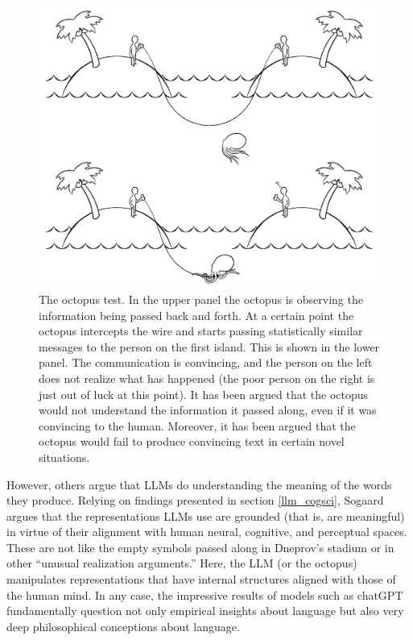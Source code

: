 \begin{figure}[h]
\centering
\includegraphics[scale=.20]{./images/octopusTest.png}
\caption[Soraya Boza.]{The octopus test. In the upper panel the octopus is observing the information being passed back and forth. At a certain point the octopus intercepts the wire and starts passing statistically similar messages to the person on the first island. This is shown in the lower panel. The communication is convincing, and the person on the left does not realize what has happened (the poor person on the right is just out of luck at this point). It has been argued that the octopus would not understand the information it passed along, even if it was convincing to the human. Moreover, it has been argued that the octopus would fail to produce convincing text in certain novel situations.}
\label{octopusTest}
\end{figure}

However, others argue that LLMs do understanding the meaning of the words they produce. Relying on findings presented in section \ref{llm_cogsci}, Sogaard \cite{sogaard2023grounding} argues that the representations LLMs use are grounded (that is, are meaningful) in virtue of their alignment with human neural, cognitive, and perceptual spaces. These are not like the empty symbols passed along in Dneprov's stadium or in other ``unusual realization arguments.'' Here, the LLM (or the octopus) manipulates representations that have internal structures aligned with those of the human mind. In any case, the impressive results of models such as chatGPT fundamentally question not only empirical insights about language but also very deep philosophical conceptions about language.

